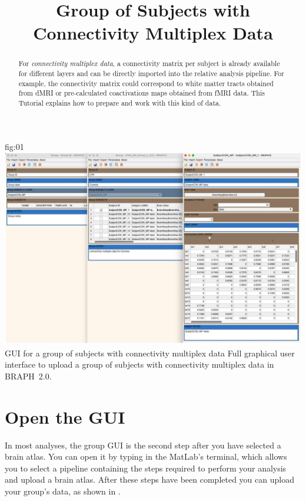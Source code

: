 \documentclass[justified]{tufte-handout}
\title{Group of Subjects with Connectivity Multiplex Data}
\begin{document}
\maketitle

\begin{abstract}
\noindent
For \emph{connectivity multiplex data}, a connectivity matrix per subject is already available for different layers and can be directly imported into the relative analysis pipeline. For example, the connectivity matrix could correspond to white matter tracts obtained from dMRI or pre-calculated coactivations maps obtained from fMRI data.
This Tutorial explains how to prepare and work with this kind of data.
\end{abstract}

\tableofcontents

	{fig:01}
	{\includegraphics{fig01.jpg}}
	{GUI for a group of subjects with connectivity multiplex data}
	{
	Full graphical user interface to upload a group of subjects with connectivity multiplex data in BRAPH~2.0. 
	}

\clearpage
\section{Open the GUI}

In most analyses, the group GUI is the second step after you have selected a brain atlas. You can open it by typing  in the MatLab's terminal, which allows you to select a pipeline containing the steps required to perform your analysis and upload a brain atlas. After these steps have been completed you can upload your group's data, as shown in .
\end{document}
